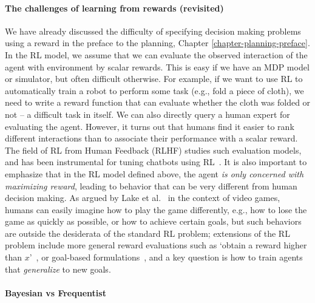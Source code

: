 \paragraph{The challenges of learning from rewards (revisited)}
We have already discussed the difficulty of specifying decision making problems using a reward in the preface to the planning, Chapter \ref{chapter-planning-preface}. In the RL model, we assume that we can evaluate the observed interaction of the agent with environment by scalar rewards. This is easy if we have an MDP model or simulator, but often difficult otherwise. For example, if we want to use RL to automatically train a robot to perform some task (e.g., fold a piece of cloth), we need to write a reward function that can evaluate whether the cloth was folded or not -- a difficult task in itself. We can also directly query a human expert for evaluating the agent. However, it turns out that humans find it easier to rank different interactions than to associate their performance with a scalar reward. The field of RL from Human Feedback (RLHF) studies such evaluation models, and has been instrumental for tuning chatbots using RL~\cite{ouyang2022training}. It is also important to emphasize that in the RL model defined above, the agent \textit{is only concerned with maximizing reward}, leading to behavior that can be very different from human decision making. As argued by Lake et al.~\cite{lake2017building} in the context of video games, humans can easily imagine how to play the game differently, e.g., how to lose the game as quickly as possible, or how to achieve certain goals, but such behaviors are outside the desiderata of the standard RL problem; extensions of the RL problem include more general reward evaluations such as `obtain a reward higher than $x$'~\cite{srivastava2019training,chen2021decision}, or goal-based formulations~\cite{kaelbling1993learning}, and a key question is how to train agents that \textit{generalize} to new goals.

\paragraph{Bayesian vs Frequentist}


